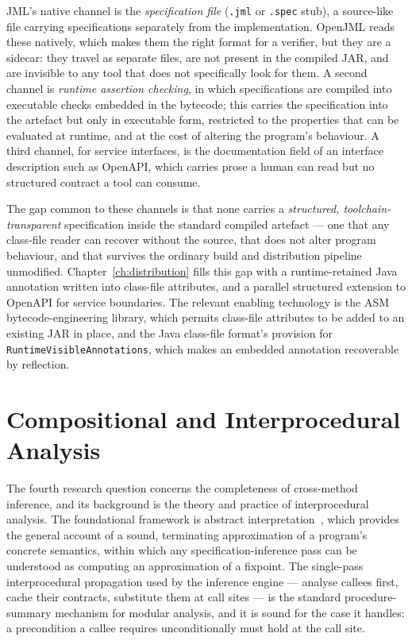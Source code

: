 JML's native channel is the \emph{specification file} (\texttt{.jml} or
\texttt{.spec} stub), a source-like file carrying specifications separately
from the implementation. OpenJML reads these natively, which makes them the
right format for a verifier, but they are a sidecar: they travel as separate
files, are not present in the compiled JAR, and are invisible to any tool that
does not specifically look for them. A second channel is \emph{runtime
assertion checking}, in which specifications are compiled into executable
checks embedded in the bytecode; this carries the specification into the
artefact but only in executable form, restricted to the properties that can be
evaluated at runtime, and at the cost of altering the program's behaviour. A
third channel, for service interfaces, is the documentation field of an
interface description such as OpenAPI, which carries prose a human can read but
no structured contract a tool can consume.

The gap common to these channels is that none carries a \emph{structured,
toolchain-transparent} specification inside the standard compiled artefact ---
one that any class-file reader can recover without the source, that does not
alter program behaviour, and that survives the ordinary build and distribution
pipeline unmodified. Chapter~\ref{ch:distribution} fills this gap with a
runtime-retained Java annotation written into class-file attributes, and a
parallel structured extension to OpenAPI for service boundaries. The relevant
enabling technology is the ASM bytecode-engineering library, which permits
class-file attributes to be added to an existing JAR in place, and the Java
class-file format's provision for \texttt{RuntimeVisibleAnnotations}, which
makes an embedded annotation recoverable by reflection.

\section{Compositional and Interprocedural Analysis}
\label{sec:bg-compositional}

The fourth research question concerns the completeness of cross-method
inference, and its background is the theory and practice of interprocedural
analysis. The foundational framework is abstract
interpretation~\cite{cousot1977abstract}, which provides the general account of
a sound, terminating approximation of a program's concrete semantics, within
which any specification-inference pass can be understood as computing an
approximation of a fixpoint. The single-pass interprocedural propagation used
by the inference engine --- analyse callees first, cache their contracts,
substitute them at call sites --- is the standard procedure-summary mechanism
for modular analysis, and it is sound for the case it handles: a precondition
a callee requires unconditionally must hold at the call site.

